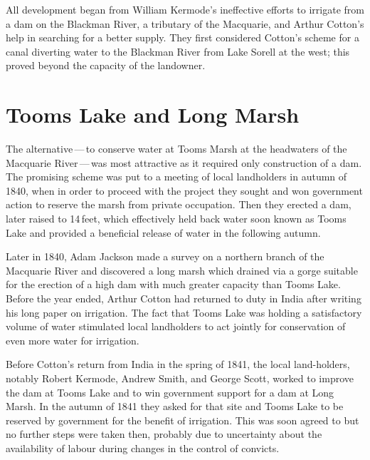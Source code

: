 All development began from William Kermode's
ineffective efforts to irrigate from a dam on the Blackman River, a
tributary of the Macquarie, and Arthur Cotton's help in searching for
a better supply.  They first considered Cotton's scheme for a canal
diverting water to the Blackman River from Lake
Sorell at the west; this proved beyond the capacity
of the landowner.

\section*{Tooms Lake and Long Marsh}

The alternative\,---\,to conserve water at Tooms Marsh at the
headwaters of the Macquarie River\,---\,was
most attractive as it required only construction of a dam.  The
promising scheme was put to a meeting of local landholders in autumn
of 1840, when in order to proceed with the project they sought and won
government action to reserve the marsh from private occupation.  Then
they erected a dam, later raised to 14\,feet, which effectively held
back water soon known as Tooms Lake and provided a beneficial release
of water in the following autumn.

Later in 1840, Adam Jackson  made a survey on a
northern branch of the Macquarie River and discovered a long marsh
which drained via a gorge suitable for the erection of a high dam with
much greater capacity than Tooms Lake.  Before the year ended, Arthur
Cotton  had returned to duty in India after writing
his long paper on irrigation.  The fact that Tooms Lake was holding a
satisfactory volume of water stimulated local landholders to act
jointly for conservation of even more water for irrigation.

Before Cotton's return from India in the spring of 1841, the local
land-holders, notably Robert Kermode,  Andrew
Smith,  and George Scott,  worked to
improve the dam at Tooms Lake
 and to win government support for a dam at Long
Marsh.  In the autumn of 1841 they asked for that site and Tooms Lake
to be reserved by government for the benefit of irrigation.  This was
soon agreed to but no further steps were taken then, probably due to
uncertainty about the availability of labour during changes in the
control of convicts.

